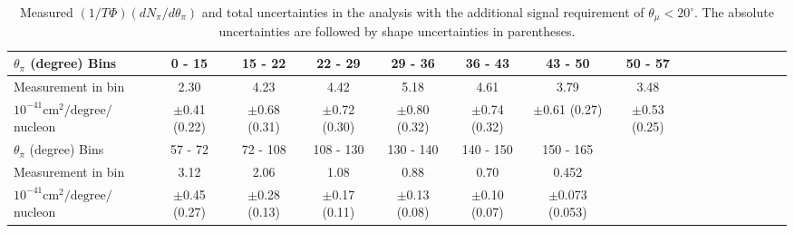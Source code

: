 \clearpage
\begingroup
\squeezetable
\begin{table}[h]
\begin{tabular}{l|ccccccccccccccc}
\hline\hline
$\theta_{\pi}$ (degree) Bins & 0 - 15 & 15 - 22 & 22 - 29 & 29 - 36 & 36 - 43 & 43 - 50 & 50 - 57 \\ 
\hline
Measurement in bin & 2.30 & 4.23 & 4.42 & 5.18 & 4.61 & 3.79 & 3.48 \\ 
$10^{-41}\mathrm{cm}^2/\mathrm{degree}/$nucleon &  $\pm$0.41 (0.22) &  $\pm$0.68 (0.31) &  $\pm$0.72 (0.30) &  $\pm$0.80 (0.32) &  $\pm$0.74 (0.32) &  $\pm$0.61 (0.27) &  $\pm$0.53 (0.25) \\ 
\hline
$\theta_{\pi}$ (degree) Bins & 57 - 72 & 72 - 108 & 108 - 130 & 130 - 140 & 140 - 150 & 150 - 165 \\ 
\hline
Measurement in bin & 3.12 & 2.06 & 1.08 & 0.88 & 0.70 & 0.452 \\ 
$10^{-41}\mathrm{cm}^2/\mathrm{degree}/$nucleon &  $\pm$0.45 (0.27) &  $\pm$0.28 (0.13) &  $\pm$0.17 (0.11) &  $\pm$0.13 (0.08) &  $\pm$0.10 (0.07) &  $\pm$0.073 (0.053) \\ 
\hline\hline
\end{tabular}
\caption{Measured $(1/T\Phi)(dN_{\pi} / d\theta_\pi)$ and total uncertainties in the \ccpi analysis with the additional signal requirement of $\theta_\mu < 20^\circ$.  The absolute uncertainties are followed by shape uncertainties in parentheses.}
\end{table}
\endgroup

